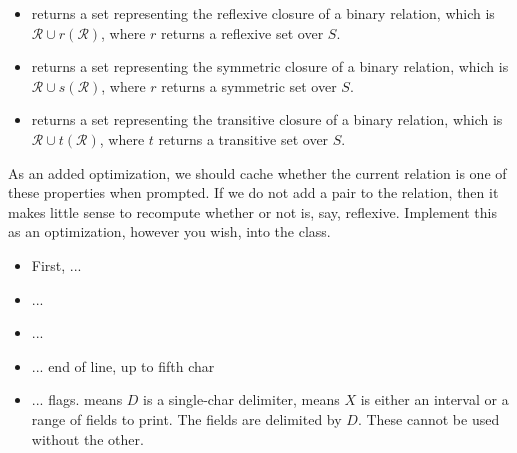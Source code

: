 \begin{itemize}
    \item {} returns a set representing the reflexive closure of a binary relation, which is $\mathcal{R} \cup r(\mathcal{R})$, where $r$ returns a reflexive set over $S$.
    
    \item {} returns a set representing the symmetric closure of a binary relation, which is $\mathcal{R} \cup s(\mathcal{R})$, where $r$ returns a symmetric set over $S$.

    \item {} returns a set representing the transitive closure of a binary relation, which is $\mathcal{R} \cup t(\mathcal{R})$, where $t$ returns a transitive set over $S$.
\end{itemize}

As an added optimization, we should cache whether the current relation is one of these properties when prompted. If we do not add a pair to the relation, then it makes little sense to recompute whether or not is, say, reflexive. Implement this as an optimization, however you wish, into the class.


\begin{itemize}
    \item First, ... 
    \item ... 
    \item ... 
    \item ...  end of line,  up to fifth char
    \item ...   flags.  means $D$ is a single-char delimiter,  means $X$ is either an interval or a range of fields to print. The fields are delimited by $D$. These cannot be used without the other.
\end{itemize}


